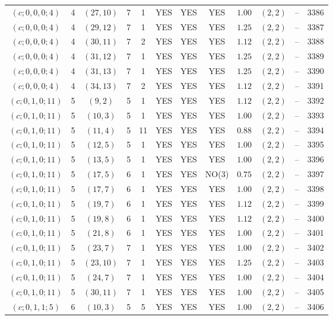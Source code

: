 \begin{longtable}{|c|c|c|c|c|c|c|c|c|c|c|c|}
$(c;0,0,0;4)$ & 4 & $(27,10)$ & 7 & 1 & YES & YES & YES & $1.00$ & $(2,2)$ & -- & 3386\\
$(c;0,0,0;4)$ & 4 & $(29,12)$ & 7 & 1 & YES & YES & YES & $1.25$ & $(2,2)$ & -- & 3387\\
$(c;0,0,0;4)$ & 4 & $(30,11)$ & 7 & 2 & YES & YES & YES & $1.12$ & $(2,2)$ & -- & 3388\\
$(c;0,0,0;4)$ & 4 & $(31,12)$ & 7 & 1 & YES & YES & YES & $1.25$ & $(2,2)$ & -- & 3389\\
$(c;0,0,0;4)$ & 4 & $(31,13)$ & 7 & 1 & YES & YES & YES & $1.25$ & $(2,2)$ & -- & 3390\\
$(c;0,0,0;4)$ & 4 & $(34,13)$ & 7 & 2 & YES & YES & YES & $1.12$ & $(2,2)$ & -- & 3391\\
$(c;0,1,0;11)$ & 5 & $(9,2)$ & 5 & 1 & YES & YES & YES & $1.12$ & $(2,2)$ & -- & 3392\\
$(c;0,1,0;11)$ & 5 & $(10,3)$ & 5 & 1 & YES & YES & YES & $1.00$ & $(2,2)$ & -- & 3393\\
$(c;0,1,0;11)$ & 5 & $(11,4)$ & 5 & 11 & YES & YES & YES & $0.88$ & $(2,2)$ & -- & 3394\\
$(c;0,1,0;11)$ & 5 & $(12,5)$ & 5 & 1 & YES & YES & YES & $1.00$ & $(2,2)$ & -- & 3395\\
$(c;0,1,0;11)$ & 5 & $(13,5)$ & 5 & 1 & YES & YES & YES & $1.00$ & $(2,2)$ & -- & 3396\\
$(c;0,1,0;11)$ & 5 & $(17,5)$ & 6 & 1 & YES & YES & NO(3) & $0.75$ & $(2,2)$ & -- & 3397\\
$(c;0,1,0;11)$ & 5 & $(17,7)$ & 6 & 1 & YES & YES & YES & $1.00$ & $(2,2)$ & -- & 3398\\
$(c;0,1,0;11)$ & 5 & $(19,7)$ & 6 & 1 & YES & YES & YES & $1.12$ & $(2,2)$ & -- & 3399\\
$(c;0,1,0;11)$ & 5 & $(19,8)$ & 6 & 1 & YES & YES & YES & $1.12$ & $(2,2)$ & -- & 3400\\
$(c;0,1,0;11)$ & 5 & $(21,8)$ & 6 & 1 & YES & YES & YES & $1.00$ & $(2,2)$ & -- & 3401\\
$(c;0,1,0;11)$ & 5 & $(23,7)$ & 7 & 1 & YES & YES & YES & $1.00$ & $(2,2)$ & -- & 3402\\
$(c;0,1,0;11)$ & 5 & $(23,10)$ & 7 & 1 & YES & YES & YES & $1.25$ & $(2,2)$ & -- & 3403\\
$(c;0,1,0;11)$ & 5 & $(24,7)$ & 7 & 1 & YES & YES & YES & $1.00$ & $(2,2)$ & -- & 3404\\
$(c;0,1,0;11)$ & 5 & $(30,11)$ & 7 & 1 & YES & YES & YES & $1.00$ & $(2,2)$ & -- & 3405\\
$(c;0,1,1;5)$ & 6 & $(10,3)$ & 5 & 5 & YES & YES & YES & $1.00$ & $(2,2)$ & -- & 3406\\

\end{longtable}
